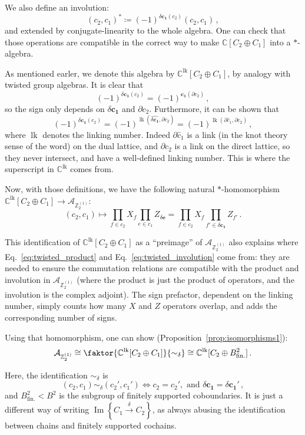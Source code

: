 \documentclass[aps,twocolumn,prx,floatfix,preprintnumbers, nofootinbib,10pt]{revtex4-2}
\numberwithin{equation}{section}
\theoremstyle{definition}
\theoremstyle{remark}
\theoremstyle{claim}
\newcommand{\be}{\begin{equation}}
\newcommand{\ee}{\end{equation}}
\newcommand{\im}{\operatorname{Im}}
\newcommand{\lbbb}{\left\{}
\newcommand{\rbbb}{\right\}}
\newcommand{\Z}{{\mathbb Z}}
\begin{document}
We also define an involution:
\be\label{eq:twisted_involution}
(c_2, c_1)^{*} \coloneqq (-1)^{\delta \bm{c_1}(c_2)} (c_2, c_1) \,,
\ee
and extended by conjugate-linearity to the whole algebra. One can check that those operations are compatible in the correct way to make $\mathbb{C}[C_2 \oplus C_1]$ into a $*$-algebra.

As mentioned earler, we denote this algebra by $\mathbb{C}^{\text{lk}}[C_2 \oplus C_1]$, by analogy with twisted group algebras. It is clear that
\be
(-1)^{\delta \bm{c_1}(c_2)} = (-1)^{\bm{c_1}(\partial c_2)} \,,
\ee
so the sign only depends on $\delta \bm{c_1}$ and $\partial c_2$. Furthermore, it can be shown that
\be
(-1)^{\delta \bm{c_1}(c_2)} = (-1)^{\operatorname{lk}(\widehat{\delta \bm{c_1}}, \partial c_2)} = (-1)^{\operatorname{lk}({\partial \hat{c}_1}, \partial c_2)} \,,
\ee
where $\operatorname{lk}$ denotes the linking number. Indeed $\partial \hat{c}_1$ is a link (in the knot theory sense of the word) on the dual lattice, and $\partial c_2$ is a link on the direct lattice, so they never intersect, and have a well-defined linking number. This is where the superscript in $\mathbb{C}^{\text{lk}}$ comes from.

Now, with those definitions, we have the following natural $*$-homomorphism $\mathbb{C}^{\text{lk}}[C_2 \oplus C_1] \rightarrow \mathcal{A}_{\Z_2^{(1)}}$:
\be
(c_2, c_1) \mapsto \prod_{f \in c_2} X_f \prod_{e \in c_1} Z_{\delta \bm{e}} = \prod_{f \in c_2} X_f \prod_{f' \in \delta \bm{c_1}} Z_{f'} \,.
\ee

This identification of $\mathbb{C}^{\text{lk}}[C_2 \oplus C_1]$ as a ``preimage'' of $\mathcal{A}_{\Z_2^{(1)}}$ also explains where Eq.~\eqref{eq:twisted_product} and Eq.~\eqref{eq:twisted_involution} come from: they are needed to ensure the commutation relations are compatible with the product and involution in $\mathcal{A}_{\Z_2^{(1)}}$ (where the product is just the product of operators, and the involution is the complex adjoint). The sign prefactor, dependent on the linking number, simply counts how many $X$ and $Z$ operators overlap, and adds the corresponding number of signs.

Using that homomorphism, one can show (Proposition~\ref{prop:isomorphisms1}):
\be
\mathcal{A}_{\Z_2^{(1)}} \cong \faktor{\mathbb{C}^{\text{lk}}[C_2 \oplus C_1]}{\sim_\delta} \cong \mathbb{C}^{\text{lk}}[C_2 \oplus B^2_\text{fin.}] \,.
\ee

Here, the identification $\sim_\delta$ is
\be
(c_2, c_1) \sim_\delta (c_2', c_1') \iff c_2 = c_2', \text{ and } \delta \bm{c_1} = \delta \bm{c_1'} \,,
\ee
and $B^2_\text{fin.} < B^2$ is the subgroup of finitely supported coboundaries. It is just a different way of writing $\im \lbbb C_1 \xrightarrow{\delta} C_2 \rbbb$, as always abusing the identification between chains and finitely supported cochains.
\end{document}
